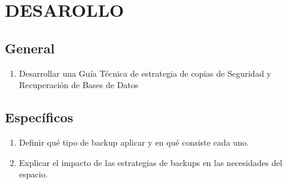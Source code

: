 \chapter{DESAROLLO}

\section{General}
\begin{enumerate}
\item Desarrollar una Guía Técnica de estrategia de copias de Seguridad y Recuperación de Bases de Datos
\end{enumerate}

\section{Espec\'ificos}
\begin{enumerate}
\item Definir qué tipo de backup aplicar y en qué consiste cada uno.
\item Explicar el impacto de las estrategias de backups en las necesidades del espacio.

\end{enumerate}